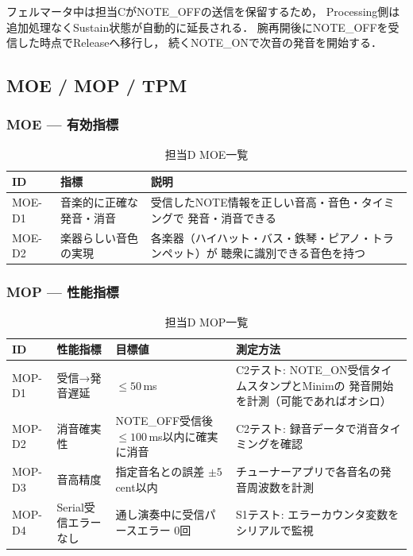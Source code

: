 \documentclass[lualatex,book,paper=a4paper,jafontsize=11.5pt,jafontscale=1.05,oneside]{jlreq}
\begin{document}
フェルマータ中は担当CがNOTE\_OFFの送信を保留するため，
Processing側は追加処理なくSustain状態が自動的に延長される．
腕再開後にNOTE\_OFFを受信した時点でReleaseへ移行し，
続くNOTE\_ONで次音の発音を開始する．


\subsection{MOE / MOP / TPM}

\subsubsection*{MOE — 有効指標}

\begin{table}[H]
  \centering
  \caption{担当D MOE一覧}
  \label{tab:moe_d}
  \begin{tabular}{llp{8cm}}
    \hline
    ID & 指標 & 説明 \\
    \hline
    MOE-D1 & 音楽的に正確な発音・消音
           & 受信したNOTE情報を正しい音高・音色・タイミングで
             発音・消音できる \\
    MOE-D2 & 楽器らしい音色の実現
           & 各楽器（ハイハット・バス・鉄琴・ピアノ・トランペット）が
             聴衆に識別できる音色を持つ \\
    \hline
  \end{tabular}
\end{table}

\subsubsection*{MOP — 性能指標}

\begin{table}[H]
  \centering
  \caption{担当D MOP一覧}
  \label{tab:mop_d}
  \begin{tabular}{llp{3.5cm}p{5cm}}
    \hline
    ID & 性能指標 & 目標値 & 測定方法 \\
    \hline
    MOP-D1 & 受信→発音遅延
           & $\leq 50$\,ms
           & C2テスト: NOTE\_ON受信タイムスタンプとMinimの
             発音開始を計測（可能であればオシロ） \\
    MOP-D2 & 消音確実性
           & NOTE\_OFF受信後 $\leq 100$\,ms以内に確実に消音
           & C2テスト: 録音データで消音タイミングを確認 \\
    MOP-D3 & 音高精度
           & 指定音名との誤差 $\pm 5$\,cent以内
           & チューナーアプリで各音名の発音周波数を計測 \\
    MOP-D4 & Serial受信エラーなし
           & 通し演奏中に受信パースエラー 0回
           & S1テスト: エラーカウンタ変数をシリアルで監視 \\
    \hline
  \end{tabular}
\end{table}
\end{document}
